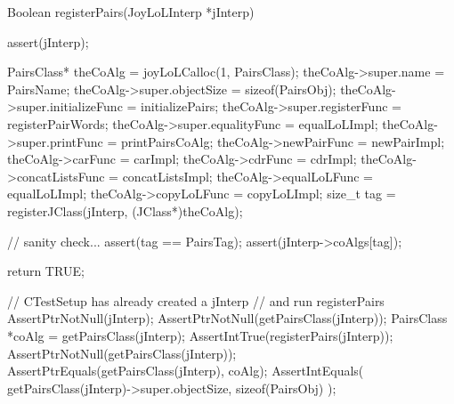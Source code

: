 \startCCode
Boolean registerPairs(JoyLoLInterp *jInterp) {
  assert(jInterp);
  
  PairsClass* theCoAlg           = joyLoLCalloc(1, PairsClass);
  theCoAlg->super.name           = PairsName;
  theCoAlg->super.objectSize     = sizeof(PairsObj);
  theCoAlg->super.initializeFunc = initializePairs;
  theCoAlg->super.registerFunc   = registerPairWords;
  theCoAlg->super.equalityFunc   = equalLoLImpl;
  theCoAlg->super.printFunc      = printPairsCoAlg;
  theCoAlg->newPairFunc          = newPairImpl;
  theCoAlg->carFunc              = carImpl;
  theCoAlg->cdrFunc              = cdrImpl;
  theCoAlg->concatListsFunc      = concatListsImpl;
  theCoAlg->equalLoLFunc         = equalLoLImpl;
  theCoAlg->copyLoLFunc          = copyLoLImpl;
  size_t tag =
    registerJClass(jInterp, (JClass*)theCoAlg);
  
  // sanity check...
  assert(tag == PairsTag);
  assert(jInterp->coAlgs[tag]);

  return TRUE;
}
\stopCCode


\startCTest
  // CTestSetup has already created a jInterp
  // and run registerPairs
  AssertPtrNotNull(jInterp);
  AssertPtrNotNull(getPairsClass(jInterp));
  PairsClass *coAlg = getPairsClass(jInterp);
  AssertIntTrue(registerPairs(jInterp));
  AssertPtrNotNull(getPairsClass(jInterp));
  AssertPtrEquals(getPairsClass(jInterp), coAlg);
  AssertIntEquals(
    getPairsClass(jInterp)->super.objectSize,
    sizeof(PairsObj)
  );
\stopCTest
\stopTestCase
\stopTestSuite

